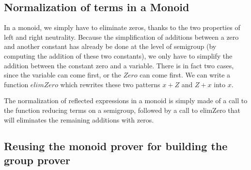 \subsection {Normalization of terms in a Monoid}

In a monoid, we simply have to eliminate zeros, thanks to the two properties of left and right neutrality. Because the simplification of additions between a zero and another constant has already be done at the level of semigroup (by computing the addition of these two constants), we only have to simplify the addition between the constant zero and a variable. There is in fact two cases, since the variable can come first, or the $Zero$ can come first. We can write a function $elimZero$ which rewrites these two patterns $x+Z$ and $Z+x$ into $x$.


The normalization of reflected expressions in a monoid is simply made of a call to the function reducing terms on a semigroup, followed by a call to elimZero that will eliminates the remaining additions with zeros. 


\subsection {Reusing the monoid prover for building the group prover}

